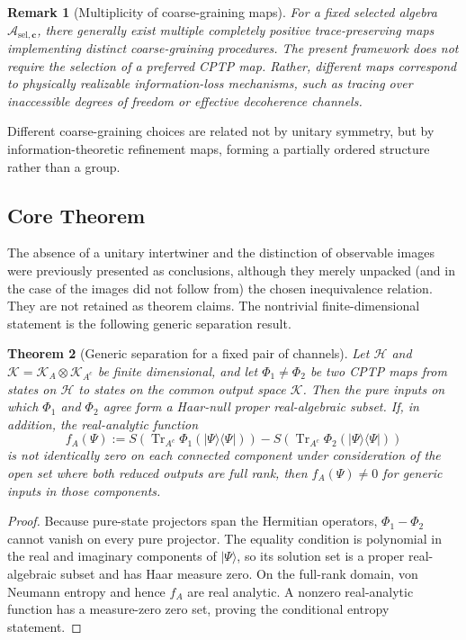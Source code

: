 \documentclass[12pt,a4paper]{article}
\newtheorem{theorem}{Theorem}[section]
\newtheorem{remark}[theorem]{Remark}
\begin{document}
\begin{remark}[Multiplicity of coarse-graining maps]
For a fixed selected algebra $\mathcal{A}_{\mathrm{sel},\mathbf{c}}$, there generally exist multiple completely positive trace-preserving maps implementing distinct coarse-graining procedures.
The present framework does not require the selection of a preferred CPTP map. 
Rather, different maps correspond to physically realizable information-loss mechanisms, such as tracing over inaccessible degrees of freedom or effective decoherence channels.
\end{remark}

Different coarse-graining choices are related not by unitary symmetry, but by information-theoretic refinement maps, forming a partially ordered structure rather than a group.

\subsection{Core Theorem}

The absence of a unitary intertwiner and the distinction of observable images were previously presented as conclusions, although they merely unpacked (and in the case of the images did not follow from) the chosen inequivalence relation.  They are not retained as theorem claims.  The nontrivial finite-dimensional statement is the following generic separation result.

\begin{theorem}[Generic separation for a fixed pair of channels]
\label{thm:inequiv}
Let $\mathcal H$ and $\mathcal K=\mathcal K_A\otimes\mathcal K_{A^c}$ be finite dimensional, and let $\Phi_1\ne\Phi_2$ be two CPTP maps from states on $\mathcal H$ to states on the common output space $\mathcal K$.  Then the pure inputs on which $\Phi_1$ and $\Phi_2$ agree form a Haar-null proper real-algebraic subset.  If, in addition, the real-analytic function
\[
f_A(\Psi):=
S\!\left(\operatorname{Tr}_{A^c}\Phi_1(|\Psi\rangle\!\langle\Psi|)\right)
-S\!\left(\operatorname{Tr}_{A^c}\Phi_2(|\Psi\rangle\!\langle\Psi|)\right)
\]
is not identically zero on each connected component under consideration of the open set where both reduced outputs are full rank, then $f_A(\Psi)\ne0$ for generic inputs in those components.
\end{theorem}

\begin{proof}
Because pure-state projectors span the Hermitian operators, $\Phi_1-\Phi_2$ cannot vanish on every pure projector.  The equality condition is polynomial in the real and imaginary components of $|\Psi\rangle$, so its solution set is a proper real-algebraic subset and has Haar measure zero.  On the full-rank domain, von Neumann entropy and hence $f_A$ are real analytic.  A nonzero real-analytic function has a measure-zero zero set, proving the conditional entropy statement.
\end{proof}
\end{document}
